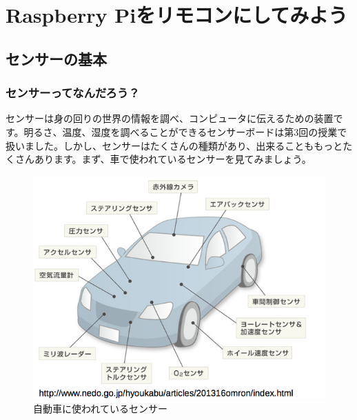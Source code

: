 \chapter{Raspberry Piをリモコンにしてみよう}
\section{センサーの基本}
\subsection{センサーってなんだろう？}
センサーは身の回りの世界の情報を調べ、コンピュータに伝えるための装置です。明るさ、温度、湿度を調べることができるセンサーボードは第3回の授業で扱いました。しかし、センサーはたくさんの種類があり、出来ることももっとたくさんあります。まず、車で使われているセンサーを見てみましょう。

\begin{figure}[htb]
\begin{center}
    \includegraphics[scale=1.0]{images/chap05/text05-img001.png}
    \caption{自動車に使われているセンサー}
    \label{fig1}
\end{center}
\end{figure}

